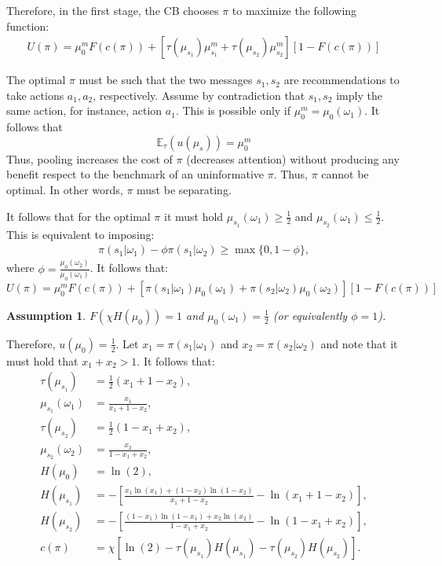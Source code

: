 \documentclass[12pt,a4paper]{article}
\newtheorem{assumption}{Assumption}
\begin{document}
Therefore, in the first stage, the CB chooses $\pi$ to maximize the following function:
\begin{align}
    U(\pi)=\mu_0^mF(c(\pi)) + \left[\tau(\mu_{s_1})\mu^m_{s_1} + \tau(\mu_{s_2})\mu^m_{s_2}\right][1-F(c(\pi))]
\end{align}

The optimal $\pi$ must be such that the two messages $s_1,s_2$ are recommendations to take actions $a_1,a_2$, respectively. Assume by contradiction that $s_1,s_2$ imply the same action, for instance, action $a_1$. This is possible only if $\mu_0^m=\mu_0(\omega_1)$. It follows that
$$\mathbb{E}_\tau(u(\mu_s)) =\mu_0^m$$
Thus, pooling increases the cost of $\pi$ (decreases attention) without producing any benefit respect to the benchmark of an uninformative $\pi$. Thus, $\pi$ cannot be optimal. In other words, $\pi$ must be separating. 

It follows that for the optimal $\pi$ it must hold $\mu_{s_1}(\omega_1)\geq\frac{1}{2}$ and $\mu_{s_2}(\omega_1)\leq\frac{1}{2}$. This is equivalent to imposing:
\begin{align}
    \pi(s_1|\omega_1)-\phi\pi(s_1|\omega_2)\geq \max\{0,1-\phi\},
\end{align}
where $\phi=\frac{\mu_0(\omega_2)}{\mu_0(\omega_1)}$. It follows that:
\begin{equation}
U(\pi)=\mu_0^mF(c(\pi)) + \left[\pi(s_1|\omega_1)\mu_{0}(\omega_1) + \pi(s_2|\omega_2)\mu_{0}(\omega_2)\right][1-F(c(\pi))]
\end{equation}

\begin{assumption}
\label{Ass1}
    $F(\chi H(\mu_0))=1$ and $\mu_0(\omega_1)=\frac{1}{2}$ (or equivalently $\phi=1$).
\end{assumption}

Therefore, $u(\mu_0) = \frac{1}{2}$. Let $x_1=\pi(s_1|\omega_1)$ and $x_2=\pi(s_2|\omega_2)$ and note that it must hold that $x_1+x_2>1$. It follows that:
\begin{align}
    \label{taus1}
    \tau(\mu_{s_1}) & = \frac{1}{2}(x_1 + 1-x_2), \\
    \label{mus1}
    \mu_{s_1}(\omega_1) & = \frac{x_1}{x_1 + 1-x_2}, \\
    \label{taus2}
    \tau(\mu_{s_2}) & = \frac{1}{2}(1-x_1 + x_2), \\
    \label{mus2}
    \mu_{s_2}(\omega_2) & = \frac{x_2}{1-x_1 + x_2}, \\
     H(\mu_0) & = \ln(2), \\
     H(\mu_{s_1}) & = -\left[\frac{x_1\ln(x_1)+(1-x_2)\ln(1-x_2)}{x_1+1-x_2}-\ln(x_1+1-x_2)\right], \\
     H(\mu_{s_2}) & = -\left[\frac{(1-x_1)\ln(1-x_1)+x_2\ln(x_2)}{1-x_1+x_2}-\ln(1-x_1+x_2)\right], \\
     c(\pi) & = \chi\left[\ln(2)-\tau(\mu_{s_1})H(\mu_{s_1})-\tau(\mu_{s_2})H(\mu_{s_2})\right].
\end{align}
\end{document}
